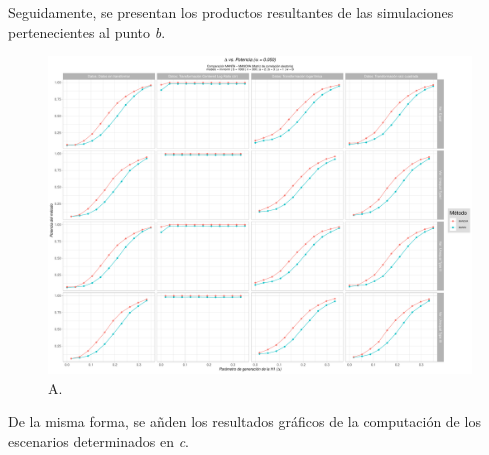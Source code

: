 \documentclass[IB,BIB]{TFUOC}%
\begin{document}
Seguidamente, se presentan los productos resultantes de las simulaciones pertenecientes al punto \textit{b}.

\begin{figure}[!htbp]
\hspace*{-1.6cm} %
    \centering
    \includegraphics[scale=.51]{OBJ1bALEAT005.pdf}
    \caption{\scriptsize{A.}}
    \label{fig:OBJ1bALEAT005}
\end{figure}

De la misma forma, se añden los resultados gráficos de la computación de los escenarios determinados en \textit{c}.
\end{document}

